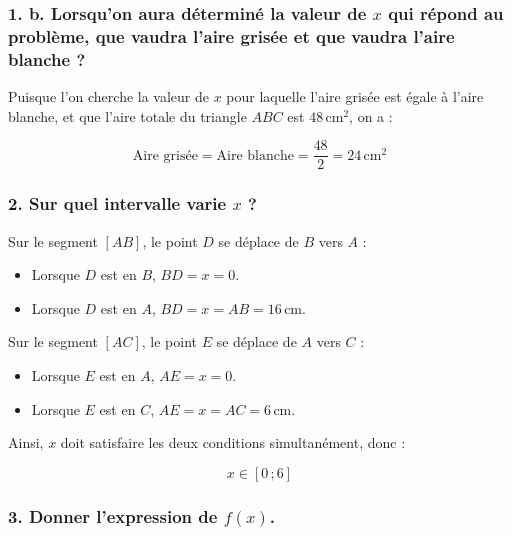\documentclass[a4paper,11pt]{article}
\begin{document}
\bigskip

\subsubsection*{1. b. Lorsqu’on aura déterminé la valeur de $x$ qui répond au problème, que vaudra l’aire grisée et que vaudra l’aire blanche ?}

Puisque l'on cherche la valeur de $x$ pour laquelle l'aire grisée est égale à l'aire blanche, et que l'aire totale du triangle $ABC$ est $48\,\text{cm}^2$, on a :

\[
\text{Aire grisée} = \text{Aire blanche} = \dfrac{48}{2} = 24\,\text{cm}^2
\]


\bigskip

\subsubsection*{2. Sur quel intervalle varie $x$ ?}

Sur le segment $[AB]$, le point $D$ se déplace de $B$ vers $A$ :

\begin{itemize}
    \item Lorsque $D$ est en $B$, $BD = x = 0$.
    \item Lorsque $D$ est en $A$, $BD = x = AB = 16\,\text{cm}$.
\end{itemize}

Sur le segment $[AC]$, le point $E$ se déplace de $A$ vers $C$ :

\begin{itemize}
    \item Lorsque $E$ est en $A$, $AE = x = 0$.
    \item Lorsque $E$ est en $C$, $AE = x = AC = 6\,\text{cm}$.
\end{itemize}

Ainsi, $x$ doit satisfaire les deux conditions simultanément, donc :

\[
x \in [0\,;6]
\]


\bigskip

\subsubsection*{3. Donner l'expression de $f(x)$.}
\end{document}

